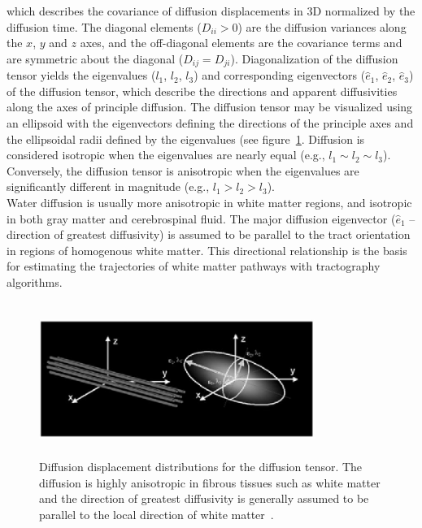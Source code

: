 {which describes the covariance of diffusion displacements in 3D normalized by the diffusion time. The diagonal elements ($D_{ii} > 0$) are the diffusion variances along the $x$, $y$ and $z$ axes, and the off-diagonal elements are the covariance terms and are symmetric about the diagonal ($D_{ij} = D_{ji}$). Diagonalization of the diffusion tensor yields the eigenvalues ($l_{1}$, $l_{2}$, $l_{3}$) and corresponding eigenvectors ($\hat{e}_{1}$, $\hat{e}_{2}$, $\hat{e}_{3}$) of the diffusion tensor, which describe the directions and apparent diffusivities along the axes of principle diffusion. The diffusion tensor may be visualized using an ellipsoid with the eigenvectors defining the directions of the principle axes and the ellipsoidal radii defined by the eigenvalues (see figure~\ref{nihms26625f2}. Diffusion is considered isotropic when the eigenvalues are nearly equal (e.g., $l_{1} \sim l_{2} \sim l_{3}$). Conversely, the diffusion tensor is anisotropic when the eigenvalues are significantly different in magnitude (e.g., $l_{1} > l_{2} > l_{3}$).\\
Water diffusion is usually more anisotropic in white matter regions, and isotropic in both gray matter and cerebrospinal fluid. The major diffusion eigenvector ($\hat{e}_{1}$ -- direction of greatest diffusivity) is assumed to be parallel to the tract orientation in regions of homogenous white matter. This directional relationship is the basis for estimating the trajectories of white matter pathways with tractography algorithms.\\

\begin{figure}[htbp]
   \begin{center}
      \includegraphics[width=9cm,height=5cm]{images/nihms26625f2.eps}\hfill

   \end{center}
   \caption{\label{nihms26625f2} Diffusion displacement distributions for the diffusion tensor. The diffusion is highly anisotropic in fibrous tissues such as white matter and the direction of greatest diffusivity is generally assumed to be parallel to the local direction of white matter~\cite{citeulike:1695483}.}
\end{figure}

}
